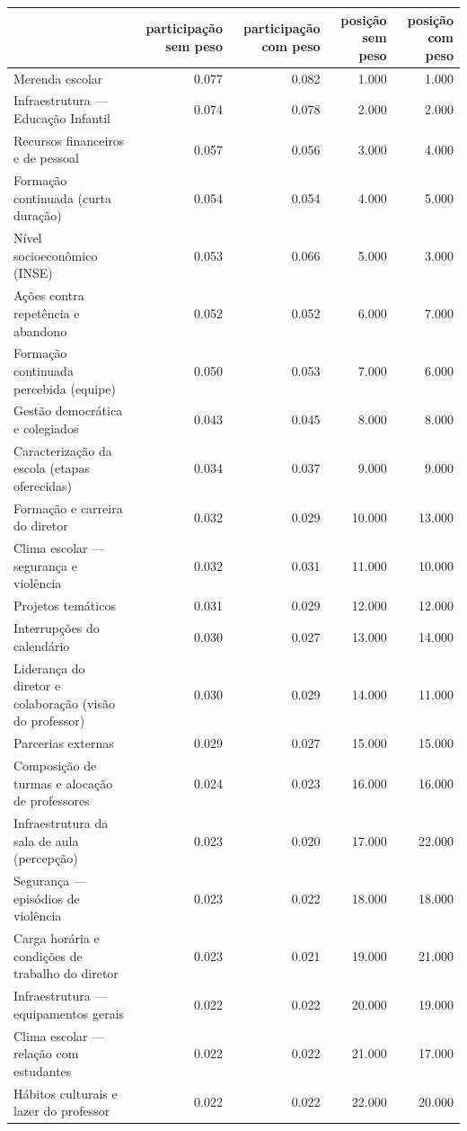 \begin{tabular}{lrrrr}
\toprule
 & participação sem peso & participação com peso & posição sem peso & posição com peso \\
\midrule
Merenda escolar & 0.077 & 0.082 & 1.000 & 1.000 \\
Infraestrutura — Educação Infantil & 0.074 & 0.078 & 2.000 & 2.000 \\
Recursos financeiros e de pessoal & 0.057 & 0.056 & 3.000 & 4.000 \\
Formação continuada (curta duração) & 0.054 & 0.054 & 4.000 & 5.000 \\
Nível socioeconômico (INSE) & 0.053 & 0.066 & 5.000 & 3.000 \\
Ações contra repetência e abandono & 0.052 & 0.052 & 6.000 & 7.000 \\
Formação continuada percebida (equipe) & 0.050 & 0.053 & 7.000 & 6.000 \\
Gestão democrática e colegiados & 0.043 & 0.045 & 8.000 & 8.000 \\
Caracterização da escola (etapas oferecidas) & 0.034 & 0.037 & 9.000 & 9.000 \\
Formação e carreira do diretor & 0.032 & 0.029 & 10.000 & 13.000 \\
Clima escolar — segurança e violência & 0.032 & 0.031 & 11.000 & 10.000 \\
Projetos temáticos & 0.031 & 0.029 & 12.000 & 12.000 \\
Interrupções do calendário & 0.030 & 0.027 & 13.000 & 14.000 \\
Liderança do diretor e colaboração (visão do professor) & 0.030 & 0.029 & 14.000 & 11.000 \\
Parcerias externas & 0.029 & 0.027 & 15.000 & 15.000 \\
Composição de turmas e alocação de professores & 0.024 & 0.023 & 16.000 & 16.000 \\
Infraestrutura da sala de aula (percepção) & 0.023 & 0.020 & 17.000 & 22.000 \\
Segurança — episódios de violência & 0.023 & 0.022 & 18.000 & 18.000 \\
Carga horária e condições de trabalho do diretor & 0.023 & 0.021 & 19.000 & 21.000 \\
Infraestrutura — equipamentos gerais & 0.022 & 0.022 & 20.000 & 19.000 \\
Clima escolar — relação com estudantes & 0.022 & 0.022 & 21.000 & 17.000 \\
Hábitos culturais e lazer do professor & 0.022 & 0.022 & 22.000 & 20.000 \\

\end{tabular}
